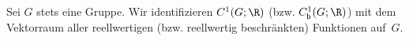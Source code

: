 \begin{thSetup} \label{setup}
    Sei $G$ stets eine Gruppe.
    Wir identifizieren $C^1(G;\R)$ (bzw. $\Cb^1(G;\R)$) mit dem Vektorraum aller
    reellwertigen (bzw. reellwertig beschränkten) Funktionen auf~$G$.
\end{thSetup}

